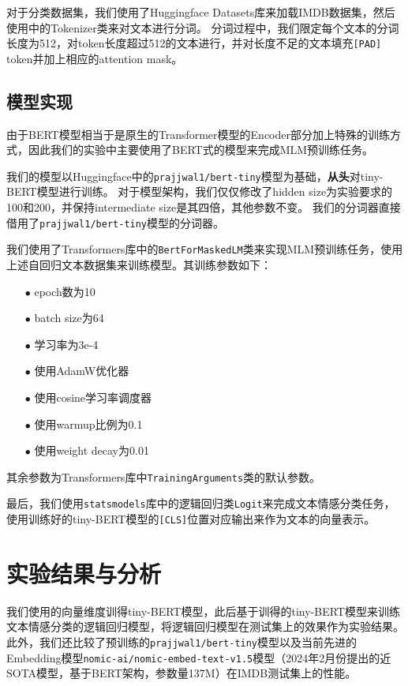 \documentclass{article}
\begin{document}
对于分类数据集，我们使用了Huggingface Datasets库来加载IMDB数据集，然后使用中的Tokenizer类来对文本进行分词。
分词过程中，我们限定每个文本的分词长度为512，对token长度超过512的文本进行，并对长度不足的文本填充\verb|[PAD]| token并加上相应的attention mask。


\subsection{模型实现}
由于BERT模型相当于是原生的Transformer模型的Encoder部分加上特殊的训练方式，因此我们的实验中主要使用了BERT式的模型来完成MLM预训练任务。

我们的模型以Huggingface中的\verb|prajjwal1/bert-tiny|模型为基础，\textbf{从头}对tiny-BERT模型进行训练。
对于模型架构，我们仅仅修改了hidden size为实验要求的100和200，并保持intermediate size是其四倍，其他参数不变。
我们的分词器直接借用了\verb|prajjwal1/bert-tiny|模型的分词器。

我们使用了Transformers库中的\verb|BertForMaskedLM|类来实现MLM预训练任务，使用上述自回归文本数据集来训练模型。其训练参数如下：
\begin{itemize}
  \item[$\bullet$] epoch数为10
  \item[$\bullet$] batch size为64
  \item[$\bullet$] 学习率为3e-4
  \item[$\bullet$] 使用AdamW优化器
  \item[$\bullet$] 使用cosine学习率调度器
  \item[$\bullet$] 使用warmup比例为0.1
  \item[$\bullet$] 使用weight decay为0.01
\end{itemize}
其余参数为Transformers库中\verb|TrainingArguments|类的默认参数。

最后，我们使用\verb|statsmodels|库中的逻辑回归类\verb|Logit|来完成文本情感分类任务，
使用训练好的tiny-BERT模型的\verb|[CLS]|位置对应输出来作为文本的向量表示。



\section{实验结果与分析}

我们使用的向量维度训得tiny-BERT模型，此后基于训得的tiny-BERT模型来训练文本情感分类的逻辑回归模型，将逻辑回归模型在测试集上的效果作为实验结果。
此外，我们还比较了预训练的\verb|prajjwal1/bert-tiny|模型以及当前先进的Embedding模型\verb|nomic-ai/nomic-embed-text-v1.5|模型（2024年2月份提出的近SOTA模型，基于BERT架构，参数量137M）在IMDB测试集上的性能。
\end{document}
